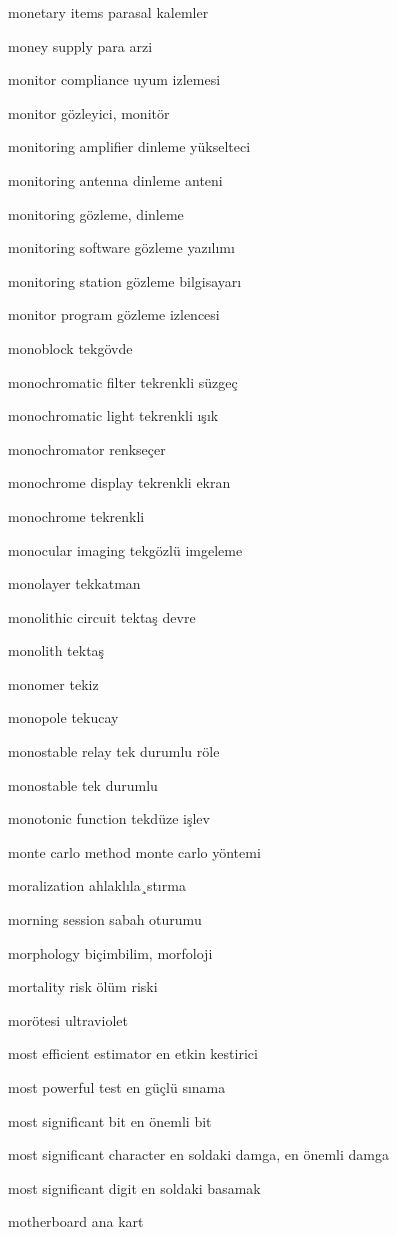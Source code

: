 \documentclass[12pt,fleqn]{article}\usepackage{../../common}
\begin{document}
monetary items parasal kalemler

money supply para arzi

monitor compliance uyum izlemesi

monitor gözleyici, monitör

monitoring amplifier dinleme yükselteci

monitoring antenna dinleme anteni

monitoring gözleme, dinleme

monitoring software gözleme yazılımı

monitoring station gözleme bilgisayarı

monitor program gözleme izlencesi

monoblock tekgövde

monochromatic filter tekrenkli süzgeç

monochromatic light tekrenkli ışık

monochromator renkseçer

monochrome display tekrenkli ekran

monochrome tekrenkli

monocular imaging tekgözlü imgeleme

monolayer tekkatman

monolithic circuit tektaş devre

monolith tektaş

monomer tekiz

monopole tekucay

monostable relay tek durumlu röle

monostable tek durumlu

monotonic function tekdüze işlev

monte carlo method monte carlo yöntemi

moralization ahlaklıla¸stırma

morning session sabah oturumu

morphology biçimbilim, morfoloji

mortality risk ölüm riski

morötesi ultraviolet

most efficient estimator en etkin kestirici

most powerful test en güçlü sınama

most significant bit en önemli bit

most significant character en soldaki damga, en önemli damga

most significant digit en soldaki basamak

motherboard ana kart
\end{document}
